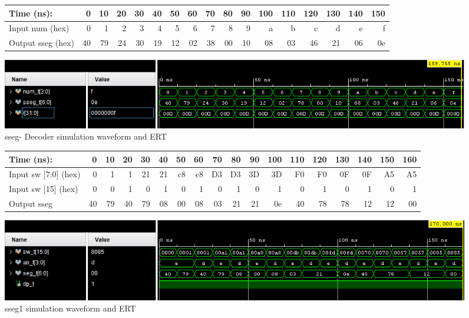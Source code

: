 \documentclass[11pt]{article}
\begin{document}
\begin{figure}[ht]\centering
	\begin{tabular}{l|rrrrrrrrrrrrrrrr}
		Time (ns): & 0 & 10 & 20 & 30 & 40 & 50 & 60 & 70 & 80 & 90 & 100 & 110 & 120 & 130 & 140 & 150 \\
		\midrule 
		Input num (hex) & 0 & 1 & 2 & 3 & 4 & 5 & 6 & 7 & 8 & 9 & a & b & c & d & e & f \\
		
		\bottomrule
		Output sseg (hex) & 40 & 79 & 24 & 30 & 19 & 12 & 02 & 38 & 00 & 10 & 08 & 03 & 46 & 21 & 06 & 0e \\
	\end{tabular}\medskip
	
	\includegraphics[width=1.0\textwidth]{decodertest}
	\caption{sseg- Decoder simulation waveform and ERT}
	\label{fig:sim_with_table}
\end{figure}
\clearpage

\begin{figure}[ht]\centering
	\begin{tabular}{l|rrrrrrrrrrrrrrrrr}
		Time (ns): & 0 & 10 & 20 & 30 & 40 & 50 & 60 & 70 & 80 & 90 & 100 & 110 & 120 & 130 & 140 & 150 & 160 \\
		\midrule 
		Input sw [7:0] (hex) & 0 & 1 & 1 & 21 & 21 & c8 & c8 & D3 & D3 & 3D & 3D & F0 & F0 & 0F & 0F & A5 & A5 \\
		
		Input sw [15] (hex) & 0 & 0 & 1 & 0 & 1 & 0 & 1 & 0 & 1 & 0 & 1 & 0 & 1 & 0 & 1 & 0 & 1  \\
		
		\bottomrule
		Output sseg & 40 & 79 & 40 & 79 & 08 & 00 & 08 & 03 & 21 & 21 & 0e & 40 & 78 & 78 & 12 & 12 & 00 \\
	\end{tabular}\medskip
	
	\includegraphics[width=1.0\textwidth]{toplevelmodfixed}
	\caption{sseg1 simulation waveform and ERT}
	\label{fig:sim_with_table}
\end{figure}
\end{document}
